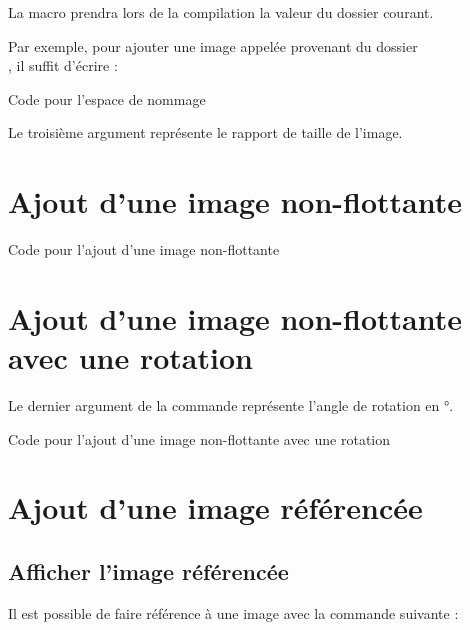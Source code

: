 {La macro \lib{\\rootImages} prendra lors de la compilation la valeur du dossier courant.

Par exemple, pour ajouter une image appelée  provenant du dossier \\
, il suffit d'écrire : 

\begin{Latex}{Code pour l'espace de nommage}
\end{Latex}

Le troisième argument représente le rapport de taille de l'image.


\section{Ajout d'une image non-flottante}


\begin{Latex}{Code pour l'ajout d'une image non-flottante}
\end{Latex}

\section{Ajout d'une image non-flottante avec une rotation}


Le dernier argument de la commande représente l'angle de rotation en °.

\begin{Latex}{Code pour l'ajout d'une image non-flottante avec une rotation}
\end{Latex}


\section{Ajout d'une image référencée}

\subsection{Afficher l'image référencée}

Il est possible de faire référence à une image avec la commande suivante : 

}
